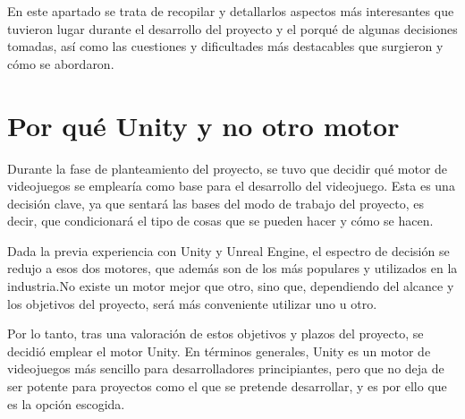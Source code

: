  \label{Aspectos relevantes}

En este apartado se trata de recopilar y detallarlos aspectos más interesantes que tuvieron lugar durante el desarrollo del proyecto y el porqué de algunas decisiones tomadas, así como las cuestiones y dificultades más destacables que surgieron y cómo se abordaron.

\section{Por qué Unity y no otro motor}
Durante la fase de planteamiento del proyecto, se tuvo que decidir qué motor de videojuegos se emplearía como base para el desarrollo del videojuego. Esta es una decisión clave, ya que sentará las bases del modo de trabajo del proyecto, es decir, que condicionará el tipo de cosas que se pueden hacer y cómo se hacen.

Dada la previa experiencia con Unity y Unreal Engine, el espectro de decisión se redujo a esos dos motores, que además son de los más populares y utilizados en la industria.No existe un motor mejor que otro, sino que, dependiendo del alcance y los objetivos del proyecto, será más conveniente utilizar uno u otro. 

Por lo tanto, tras una valoración de estos objetivos y plazos del proyecto, se decidió emplear el motor Unity. En términos generales, Unity es un motor de videojuegos más sencillo para desarrolladores principiantes, pero que no deja de ser potente para proyectos como el que se pretende desarrollar, y es por ello que es la opción escogida.

